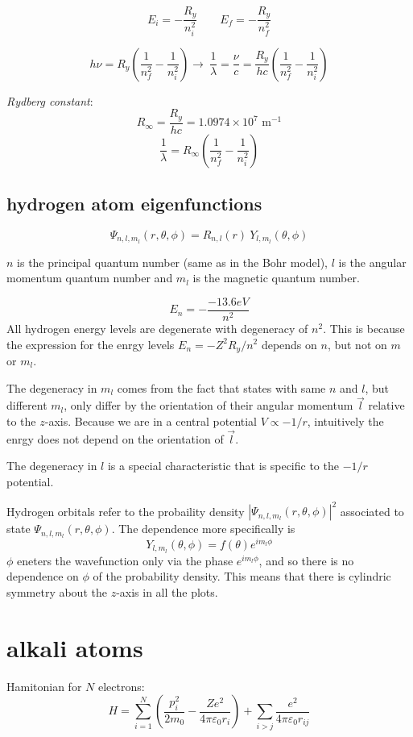 \documentclass[10pt, a4paper, twocolumn]{article}
\newcommand{\deff}[1]{\par \noindent \textit{#1}: }
\newcommand{\pfs}{\ensuremath{\varepsilon _0}}
\newcommand{\arr}{\ensuremath{\longrightarrow\ }}
\begin{document}
\[ E_i = - \frac{R_y}{n_i^2}
\qquad E_f = -\frac{R_y}{n_f^2} \]

\[h \nu = R_y
\left( \frac{1}{n_f^2} - \frac{1}{n_i^2} \right)
\arr
\frac{1}{\lambda} = \frac{\nu}{c} = \frac{R_y}{hc}
\left( \frac{1}{n_f^2} - \frac{1}{n_i^2} \right) \]
\deff{Rydberg constant}
\[R_\infty = \frac{R_y}{hc} = 1.0974 \times 10^7
\text{ m}^{-1} \]
\[ \frac1\lambda  = R_\infty
\left( \frac{1}{n_f^2} - \frac{1}{n_i^2} \right) \]

\subsection{hydrogen atom eigenfunctions}
\[ \Psi _{n,l,m_l} (r, \theta, \phi)
= R_{n,l} (r) \ Y_{l, m_l} (\theta , \phi) \]

$n$ is the principal quantum number (same as in the Bohr model), $l$ is the angular momentum quantum number and $m_l$ is the magnetic quantum number.

\[E_n = -\frac{-13.6eV}{n^2}\]
All hydrogen energy levels are degenerate with degeneracy of $n^2$. This is because the expression for the enrgy levels $E_n = -Z^2R_y/n^2$ depends on $n$, but not on $m$ or $m_l$.

The degeneracy in $m_l$ comes from the fact that states with same $n$ and $l$, but different $m_l$, only differ by the orientation of their angular momentum $\vec l$ relative to the $z$-axis. Because we are in a central potential $V \propto -1/r$, intuitively the enrgy does not depend on the orientation of $\vec l$.

The degeneracy in $l$ is a special characteristic that is specific to the $-1/r$ potential.

Hydrogen orbitals refer to the probaility density
 $|\Psi _{n,l,m_l}(r,\theta , \phi)|^2$
 associated to state
$\Psi _{n,l,m_l}(r,\theta , \phi)$. The dependence more specifically is
\[ Y_{l,m_l}(\theta, \phi) = f(\theta ) e^{im_l \phi} \]
$\phi$ eneters the wavefunction only via the phase $e^{im_l\phi}$, and so there is no dependence on $\phi$ of the probability density. This means that there is cylindric symmetry about the $z$-axis in all the plots.

\section{alkali atoms}

Hamitonian for $N$ electrons:
\[ H = \sum_{i=1}^N
\left(\frac{p_i^2}{2m_0}-\frac{Ze^2}{4\pi \pfs r_i}
\right)
+ \sum _{i>j} \frac{e^2}{4\pi \pfs r_{ij}} \]
\end{document}
